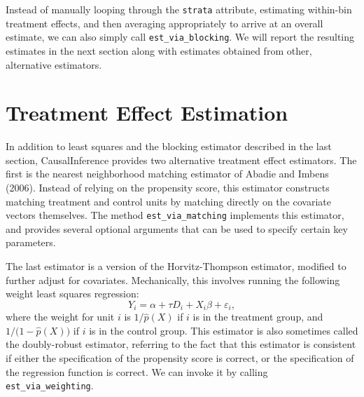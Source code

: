 \documentclass[12pt]{article}
\theoremstyle{definition}
\theoremstyle{definition}
\theoremstyle{definition}
\theoremstyle{remark}
\begin{document}
Instead of manually looping through the \texttt{strata} attribute, estimating within-bin treatment effects, and then averaging appropriately to arrive at an overall estimate, we can also simply call \texttt{est\_via\_blocking}. We will report the resulting estimates in the next section along with estimates obtained from other, alternative estimators.

\section*{Treatment Effect Estimation}

In addition to least squares and the blocking estimator described in the last section, CausalInference provides two alternative treatment effect estimators. The first is the nearest neighborhood matching estimator of Abadie and Imbens (2006). Instead of relying on the propensity score, this estimator constructs matching treatment and control units by matching directly on the covariate vectors themselves. The method \texttt{est\_via\_matching} implements this estimator, and provides several optional arguments that can be used to specify certain key parameters.

The last estimator is a version of the Horvitz-Thompson estimator, modified to further adjust for covariates. Mechanically, this involves running the following weight least squares regression:
\[Y_i = \alpha + \tau D_i + X_i \beta + \varepsilon_i,\]
where the weight for unit $i$ is $1/\hat{p}(X)$ if $i$ is in the treatment group, and $1/\big(1-\hat{p}(X)\big)$ if $i$ is in the control group. This estimator is also sometimes called the doubly-robust estimator, referring to the fact that this estimator is consistent if either the specification of the propensity score is correct, or the specification of the regression function is correct. We can invoke it by calling \texttt{est\_via\_weighting}.
\end{document}
